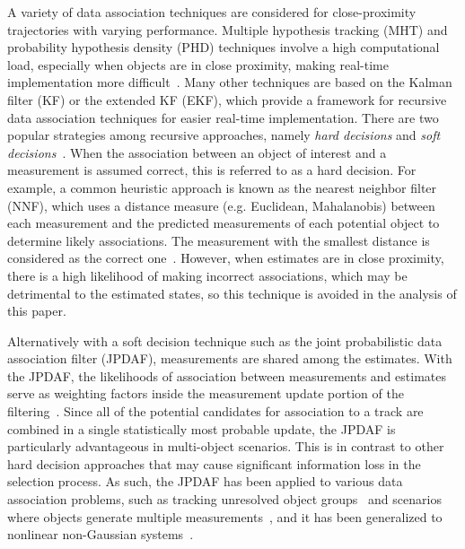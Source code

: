 A variety of data association techniques are considered for close-proximity trajectories with varying performance.
Multiple hypothesis tracking (MHT) and probability hypothesis density (PHD) techniques involve a high computational load, especially when objects are in close proximity, making real-time implementation more difficult~\cite{MHT1,PHD1,PHD2}.
Many other techniques are based on the Kalman filter (KF) or the extended KF (EKF), which provide a framework for recursive data association techniques for easier real-time implementation.
There are two popular strategies among recursive approaches, namely \emph{hard decisions} and \emph{soft decisions}~\cite{JPDAF1}.
When the association between an object of interest and a measurement is assumed correct, this is referred to as a hard decision.
For example, a common heuristic approach is known as the nearest neighbor filter (NNF), which uses a distance measure (e.g. Euclidean, Mahalanobis) between each measurement and the predicted measurements of each potential object to determine likely associations.
The measurement with the smallest distance is considered as the correct one~\cite{NN2}.
However, when estimates are in close proximity, there is a high likelihood of making incorrect associations, which may be detrimental to the estimated states, so this technique is avoided in the analysis of this paper.

Alternatively with a soft decision technique such as the joint probabilistic data association filter (JPDAF), measurements are shared among the estimates. With the JPDAF, the likelihoods of association between measurements and estimates serve as weighting factors inside the measurement update portion of the filtering~\cite{JPDAF1,TrackDataAssoc}.
Since all of the potential candidates for association to a track are combined in a single statistically most probable update, the JPDAF is particularly advantageous in multi-object scenarios.
This is in contrast to other hard decision approaches that may cause significant information loss in the selection process.
As such, the JPDAF has been applied to various data association problems, such as tracking unresolved object groups~\cite{SveUlmDan10} and scenarios where objects generate multiple measurements~\cite{HabThaThaMalKir13}, and it has been generalized to nonlinear non-Gaussian systems~\cite{WeiJinYou05}.

